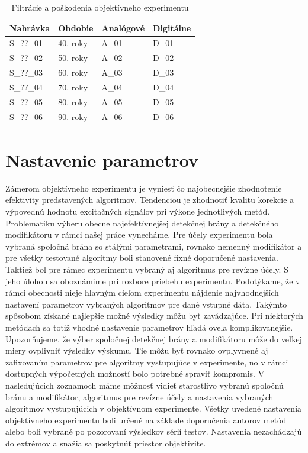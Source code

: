 \begin{table}[!h]
\centering
\caption{Filtrácie a poškodenia objektívneho experimentu}
\begin{tabular}{l l l l}
\hline
Nahrávka & Obdobie & Analógové & Digitálne\\
\hline
S\_??\_01 & 40. roky & A\_01 & D\_01\\
S\_??\_02 & 50. roky & A\_02 & D\_02\\
S\_??\_03 & 60. roky & A\_03 & D\_03\\
S\_??\_04 & 70. roky & A\_04 & D\_04\\
S\_??\_05 & 80. roky & A\_05 & D\_05\\
S\_??\_06 & 90. roky & A\_06 & D\_06\\
\hline
\end{tabular}
\label{tabulka:filtracie}
\end{table}

\section{Nastavenie parametrov}
Zámerom objektívneho experimentu je vyniesť čo najobecnejšie zhodnotenie efektivity predstavených algoritmov. Tendenciou je zhodnotiť kvalitu korekcie a výpovednú hodnotu excitačných signálov pri výkone jednotlivých metód. Problematiku výberu obecne najefektívnejšej detekčnej brány a detekčného modifikátoru v rámci našej práce vynecháme. Pre účely experimentu bola vybraná spoločná brána so stálými parametrami, rovnako nemenný modifikátor a pre všetky testované algoritmy boli stanovené fixné doporučené nastavenia. Taktiež bol pre rámec experimentu vybraný aj algoritmus pre revízne účely. S jeho úlohou sa oboznámime pri rozbore priebehu experimentu. Podotýkame, že v rámci obecnosti nieje hlavným cieľom experimentu nájdenie najvhodnejších nastavení parametrov vybraných algoritmov pre dané vstupné dáta. Takýmto spôsobom získané najlepšie možné výsledky môžu byť zavádzajúce. Pri niektorých metódach sa totiž vhodné nastavenie parametrov hľadá oveľa komplikovanejšie. Upozorňujeme, že výber spoločnej detekčnej brány a modifikátoru môže do veľkej miery ovplivniť výsledky výskumu. Tie môžu byť rovnako ovplyvnené aj zafixovaním parametrov pre algoritmy vystupujúce v experimente, no v rámci dostupných výpočetných možností bolo potrebné spraviť kompromis. V nasledujúcich zoznamoch máme môžnosť vidieť starostlivo vybranú spoločnú bránu a modifikátor, algoritmus pre revízne účely a nastavenia vybraných algoritmov vystupujúcich v objektívnom experimente. Všetky uvedené nastavenia objektívneho experimentu boli určené na základe doporučenia autorov metód alebo boli vybrané po pozorovaní výsledkov sérií testov. Nastavenia nezachádzajú do extrémov a snažia sa poskytnúť priestor objektivite.

